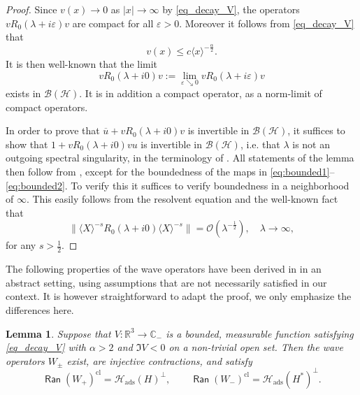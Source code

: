 \documentclass{article}
\def\B{\mathscr B}
\def\C{\mathbb C}
\def\H{\mathcal H}
\def\R{\mathbb R}
\def\O{\mathcal{O}}
\def\Ran{\mathop{\mathsf{Ran}}\nolimits}
\def\cl{{\mathrm{cl}}}
\def\ads{{\mathrm{ads}}}
\newtheorem{Lemma}[Theorem]{Lemma}
\begin{document}
\begin{proof}
Since $v(x)\to0$ as $|x|\to\infty$ by \eqref{eq_decay_V}, the operators $vR_0(\lambda+i\varepsilon)v$ are compact for all $\varepsilon>0$. Moreover it follows from \eqref{eq_decay_V} that 
\begin{equation*}
v(x)\leq c \langle x\rangle^{-\frac{\alpha}{2}}.
\end{equation*}
It is then well-known that the limit 
$$
v R_0(\lambda + i0)v := \lim_{\varepsilon \searrow 0} v R_0(\lambda + i\varepsilon)v
$$
exists in $\B(\H)$. It is in addition a compact operator, as a norm-limit of compact operators. 

In order to prove that $\overline{u} +v R_0(\lambda+i0)v$ is invertible in $\B(\H)$, it suffices to show that $1 +v R_0(\lambda+i0)vu$ is invertible in $\B(\H)$, i.e. that $\lambda$ is not an outgoing spectral singularity, in the terminology of \cite{FaFr23}.  All statements of the lemma then follow from \cite[Prop.~3.7]{FaFr23}, except for the boundedness of the maps in \eqref{eq:bounded1}--\eqref{eq:bounded2}. To verify this it suffices to verify boundedness in a neighborhood of $\infty$. This easily follows from the resolvent equation and the well-known fact that
$$
\|\langle X\rangle^{-s}R_0(\lambda+i0)\langle X\rangle^{-s}\|= \O(\lambda^{-\frac12}),\quad\lambda\to\infty,
$$
for any $s>\frac12$.
\end{proof}

The following properties of the wave operators have been derived in \cite[Prop. 3.4 and 3.5]{FaFr18} in an abstract setting, using assumptions that are not necessarily satisfied in our context. It is however straightforward to adapt the proof, we only emphasize the differences here.

\begin{Lemma}\label{lem:existence_wave}
Suppose that $V:\R^3\to \C_-$ is a bounded, measurable function satisfying \eqref{eq_decay_V} with $\alpha>2$ and $\Im V<0$ on a non-trivial open set.
Then the wave operators $W_\pm$ exist, are injective contractions, and satisfy
\begin{equation*}
\Ran(W_+)^{\cl}=\H_\ads(H)^\perp, \qquad \Ran(W_-)^{\cl}=\H_\ads(H^*)^\perp.
\end{equation*}
\end{Lemma}
\end{document}
